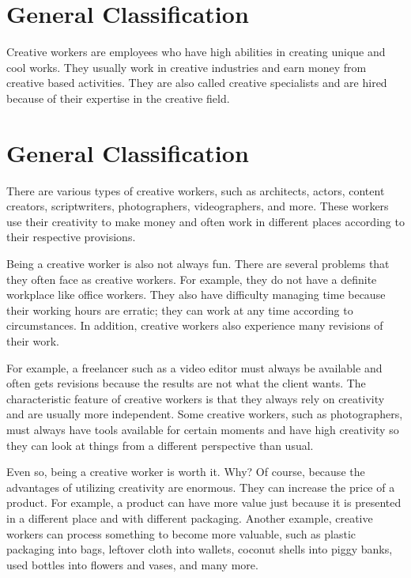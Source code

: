 \documentclass[a4paper, 14pt]{extarticle}
\begin{document}
\section*{General Classification}

\justifying
Creative workers are employees who have high abilities in creating unique and cool works. They usually work in creative industries and earn money from creative based activities. They are also called creative specialists and are hired because of their expertise in the creative field.

\bigskip

\section*{General Classification}

There are various types of creative workers, such as architects, actors, content creators, scriptwriters, photographers, videographers, and more. These workers use their creativity to make money and often work in different places according to their respective provisions.

Being a creative worker is also not always fun. There are several problems that they often face as creative workers. For example, they do not have a definite workplace like office workers. They also have difficulty managing time because their working hours are erratic; they can work at any time according to circumstances. In addition, creative workers also experience many revisions of their work.

For example, a freelancer such as a video editor must always be available and often gets revisions because the results are not what the client wants. The characteristic feature of creative workers is that they always rely on creativity and are usually more independent. Some creative workers, such as photographers, must always have tools available for certain moments and have high creativity so they can look at things from a different perspective than usual.

Even so, being a creative worker is worth it. Why? Of course, because the advantages of utilizing creativity are enormous. They can increase the price of a product. For example, a product can have more value just because it is presented in a different place and with different packaging. Another example, creative workers can process something to become more valuable, such as plastic packaging into bags, leftover cloth into wallets, coconut shells into piggy banks, used bottles into flowers and vases, and many more. 
\end{document}
